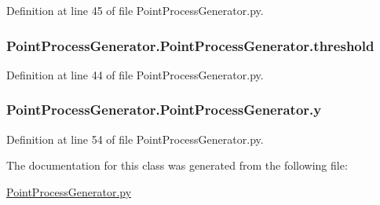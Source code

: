 Definition at line 45 of file Point\-Process\-Generator.\-py.

\hypertarget{class_point_process_generator_1_1_point_process_generator_abcb23e09b752b797a1f11f2679373ca1}{
\subsubsection[{threshold}]{\setlength{\rightskip}{0pt plus 5cm}Point\-Process\-Generator.\-Point\-Process\-Generator.\-threshold}}\label{class_point_process_generator_1_1_point_process_generator_abcb23e09b752b797a1f11f2679373ca1}


Definition at line 44 of file Point\-Process\-Generator.\-py.

\hypertarget{class_point_process_generator_1_1_point_process_generator_a70a43b5c26daf20833ecbc9f4d979726}{
\subsubsection[{y}]{\setlength{\rightskip}{0pt plus 5cm}Point\-Process\-Generator.\-Point\-Process\-Generator.\-y}}\label{class_point_process_generator_1_1_point_process_generator_a70a43b5c26daf20833ecbc9f4d979726}


Definition at line 54 of file Point\-Process\-Generator.\-py.



The documentation for this class was generated from the following file\-:\begin{DoxyCompactItemize}
\item 
\hyperlink{_point_process_generator_8py}{Point\-Process\-Generator.\-py}\end{DoxyCompactItemize}
